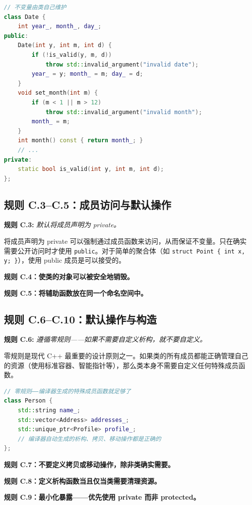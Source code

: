 \begin{lstlisting}[language=C++]
// 不变量由类自己维护
class Date {
    int year_, month_, day_;
public:
    Date(int y, int m, int d) {
        if (!is_valid(y, m, d))
            throw std::invalid_argument("invalid date");
        year_ = y; month_ = m; day_ = d;
    }
    void set_month(int m) {
        if (m < 1 || m > 12)
            throw std::invalid_argument("invalid month");
        month_ = m;
    }
    int month() const { return month_; }
    // ...
private:
    static bool is_valid(int y, int m, int d);
};
\end{lstlisting}

\subsection{规则 C.3--C.5：成员访问与默认操作}

\textbf{规则 C.3:} \textit{默认将成员声明为 private。}

将成员声明为 private 可以强制通过成员函数来访问，从而保证不变量。只在确实需要公开访问时才使用 \texttt{public}。对于简单的聚合体（如 \texttt{struct Point \{ int x, y; \}}），使用 public 成员是可以接受的。

\textbf{规则 C.4：使类的对象可以被安全地销毁。}

\textbf{规则 C.5：将辅助函数放在同一个命名空间中。}

\subsection{规则 C.6--C.10：默认操作与构造}

\textbf{规则 C.6:} \textit{遵循零规则——如果不需要自定义析构，就不要自定义。}

零规则是现代 C++ 最重要的设计原则之一。如果类的所有成员都能正确管理自己的资源（使用标准容器、智能指针等），那么类本身不需要自定义任何特殊成员函数。

\begin{lstlisting}[language=C++]
// 零规则——编译器生成的特殊成员函数就足够了
class Person {
    std::string name_;
    std::vector<Address> addresses_;
    std::unique_ptr<Profile> profile_;
    // 编译器自动生成的析构、拷贝、移动操作都是正确的
};
\end{lstlisting}

\textbf{规则 C.7：不要定义拷贝或移动操作，除非类确实需要。}

\textbf{规则 C.8：定义析构函数当且仅当类需要清理资源。}

\textbf{规则 C.9：最小化暴露——优先使用 private 而非 protected。}

